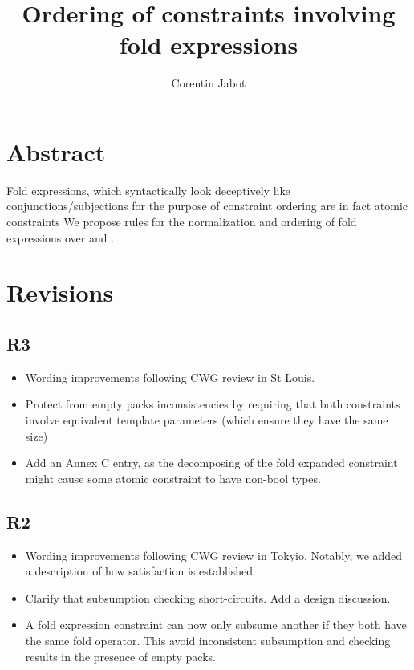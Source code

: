 \documentclass{wg21}
\title{Ordering of constraints involving fold expressions}
\author{Corentin Jabot}{corentin.jabot@gmail.com}
\begin{document}
\maketitle

\section{Abstract}

Fold expressions, which syntactically look deceptively like conjunctions/subjections for the purpose of constraint ordering are in fact atomic constraints
We propose rules for the normalization and ordering of fold expressions over \tcode{\&\&} and \tcode{||}.

\section{Revisions}

\subsection{R3}

\begin{itemize}
\item Wording improvements following CWG review in St Louis.
\item Protect from empty packs inconsistencies
by requiring that both constraints involve equivalent template parameters (which ensure they have the same size)
\item Add an Annex C entry, as the decomposing of the fold expanded
constraint might cause some atomic constraint to have non-bool types.
\end{itemize}
\subsection{R2}

\begin{itemize}
\item Wording improvements following CWG review in Tokyio. Notably, we added a description of how satisfaction is established.
\item Clarify that subsumption checking short-circuits. Add a design discussion.
\item A fold expression constraint can now only subsume another if they both have the same fold operator. This avoid inconsistent subsumption and checking results in the presence of empty packs.
\end{itemize}
\end{document}
